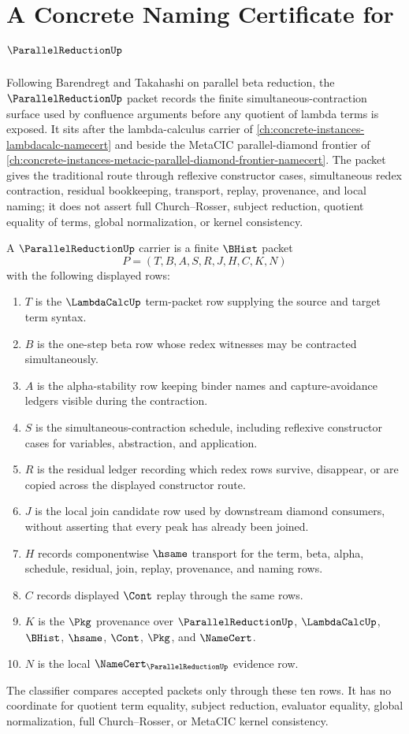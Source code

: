 \chapter{A Concrete Naming Certificate for $\ParallelReductionUp$}
\label{ch:concrete-instances-parallel-reduction-namecert}

Following Barendregt and Takahashi on parallel beta reduction, the $\ParallelReductionUp$ packet records the finite simultaneous-contraction surface used by confluence arguments before any quotient of lambda terms is exposed. It sits after the lambda-calculus carrier of \autoref{ch:concrete-instances-lambdacalc-namecert} and beside the MetaCIC parallel-diamond frontier of \autoref{ch:concrete-instances-metacic-parallel-diamond-frontier-namecert}. The packet gives the traditional route through reflexive constructor cases, simultaneous redex contraction, residual bookkeeping, transport, replay, provenance, and local naming; it does not assert full Church--Rosser, subject reduction, quotient equality of terms, global normalization, or kernel consistency.

\begin{definition}
\label{def:parallel-reduction-carrier}
A $\ParallelReductionUp$ carrier is a finite $\BHist$ packet
$$
P=(T,B,A,S,R,J,H,C,K,N)
$$
with the following displayed rows:
\begin{enumerate}
\item $T$ is the $\LambdaCalcUp$ term-packet row supplying the source and target term syntax.
\item $B$ is the one-step beta row whose redex witnesses may be contracted simultaneously.
\item $A$ is the alpha-stability row keeping binder names and capture-avoidance ledgers visible during the contraction.
\item $S$ is the simultaneous-contraction schedule, including reflexive constructor cases for variables, abstraction, and application.
\item $R$ is the residual ledger recording which redex rows survive, disappear, or are copied across the displayed constructor route.
\item $J$ is the local join candidate row used by downstream diamond consumers, without asserting that every peak has already been joined.
\item $H$ records componentwise $\hsame$ transport for the term, beta, alpha, schedule, residual, join, replay, provenance, and naming rows.
\item $C$ records displayed $\Cont$ replay through the same rows.
\item $K$ is the $\Pkg$ provenance over $\ParallelReductionUp$, $\LambdaCalcUp$, $\BHist$, $\hsame$, $\Cont$, $\Pkg$, and $\NameCert$.
\item $N$ is the local $\NameCert_{\ParallelReductionUp}$ evidence row.
\end{enumerate}
The classifier compares accepted packets only through these ten rows. It has no coordinate for quotient term equality, subject reduction, evaluator equality, global normalization, full Church--Rosser, or MetaCIC kernel consistency.
\end{definition}

